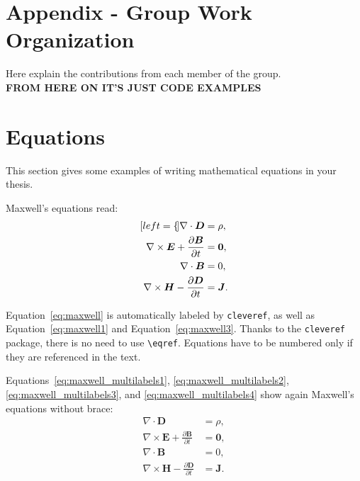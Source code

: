\documentclass[11pt,a4paper]{article}
\begin{document}
\section{Appendix - Group Work Organization}
Here explain the contributions from each member of the group.\\
\textbf{FROM HERE ON IT'S JUST CODE EXAMPLES}
\section{Equations}
\label{sec:eqs}
This section gives some examples of writing mathematical equations in your thesis.

Maxwell's equations read:
\begin{subequations}
    \label{eq:maxwell}
    \begin{align}[left=\empheqlbrace]
        \nabla\cdot \bm{D}                                         & = \rho, \label{eq:maxwell1}   \\
        \nabla \times \bm{E} +  \frac{\partial \bm{B}}{\partial t} & = \bm{0}, \label{eq:maxwell2} \\
        \nabla\cdot \bm{B}                                         & = 0, \label{eq:maxwell3}      \\
        \nabla \times \bm{H} - \frac{\partial \bm{D}}{\partial t}  & = \bm{J}. \label{eq:maxwell4}
    \end{align}
\end{subequations}

Equation~\eqref{eq:maxwell} is automatically labeled by \texttt{cleveref},
as well as Equation~\eqref{eq:maxwell1} and Equation~\eqref{eq:maxwell3}.
Thanks to the \verb|cleveref| package, there is no need to use \verb|\eqref|.
Equations have to be numbered only if they are referenced in the text.

Equations~\eqref{eq:maxwell_multilabels1}, \eqref{eq:maxwell_multilabels2}, \eqref{eq:maxwell_multilabels3}, and \eqref{eq:maxwell_multilabels4} show again Maxwell's equations without brace:
\begin{align}
    \nabla\cdot \bm{D}                                         & = \rho, \label{eq:maxwell_multilabels1}   \\
    \nabla \times \bm{E} +  \frac{\partial \bm{B}}{\partial t} & = \bm{0}, \label{eq:maxwell_multilabels2} \\
    \nabla\cdot \bm{B}                                         & = 0, \label{eq:maxwell_multilabels3}      \\
    \nabla \times \bm{H} - \frac{\partial \bm{D}}{\partial t}  & = \bm{J} \label{eq:maxwell_multilabels4}.
\end{align}
\end{document}
